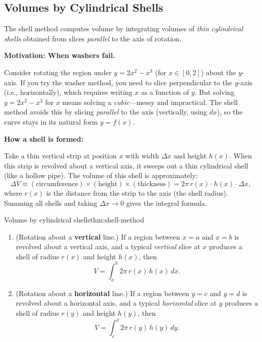 \newpage
\subsection{Volumes by Cylindrical Shells}

The shell method computes volume by integrating volumes of \emph{thin cylindrical shells} obtained from slices \emph{parallel} to the axis of rotation.

\textbf{Motivation: When washers fail.}

Consider rotating the region under $y=2x^2-x^3$ (for $x\in[0,2]$) about the $y$-axis. If you try the washer method, you need to slice perpendicular to the $y$-axis (i.e., horizontally), which requires writing $x$ as a function of $y$. But solving $y=2x^2-x^3$ for $x$ means solving a \emph{cubic}---messy and impractical. The shell method avoids this by slicing \emph{parallel} to the axis (vertically, using $dx$), so the curve stays in its natural form $y=f(x)$.

\textbf{How a shell is formed:}

Take a thin vertical strip at position $x$ with width $\Delta x$ and height $h(x)$. When this strip is revolved about a vertical axis, it sweeps out a thin cylindrical shell (like a hollow pipe). The volume of this shell is approximately:
\[
\Delta V \approx (\text{circumference})\times(\text{height})\times(\text{thickness})
= 2\pi\,r(x)\cdot h(x)\cdot \Delta x,
\]
where $r(x)$ is the distance from the strip to the axis (the shell radius). Summing all shells and taking $\Delta x\to 0$ gives the integral formula.

\begin{theorem}{Volume by cylindrical shells}{thm:shell-method}
\begin{enumerate}[label=(\alph*)]
\item (Rotation about a \textbf{vertical} line.) If a region between $x=a$ and $x=b$ is revolved about a vertical axis, and a typical \emph{vertical} slice at $x$ produces a shell of radius $r(x)$ and height $h(x)$, then
\[
V=\int_a^b 2\pi\,r(x)\,h(x)\,dx.
\]
\item (Rotation about a \textbf{horizontal} line.) If a region between $y=c$ and $y=d$ is revolved about a horizontal axis, and a typical \emph{horizontal} slice at $y$ produces a shell of radius $r(y)$ and height $h(y)$, then
\[
V=\int_c^d 2\pi\,r(y)\,h(y)\,dy.
\]
\end{enumerate}
\end{theorem}

